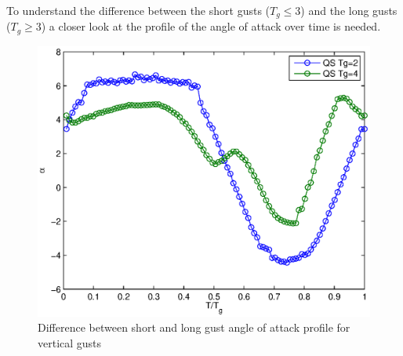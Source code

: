 %
%
%
%


\FloatBarrier

\par To understand the difference between the short gusts ($T_g \leq 3$) and the long gusts ($T_g \geq 3$) a closer look at the profile of the angle of attack over time is needed.


\begin{figure}[h]
  \centering
  \includegraphics{./Figures/alpha_vs_Tg_QS_short_vs_long_wt1.eps}
  \caption{Difference between short and long gust angle of attack profile for vertical gusts}
  \label{fig:short_vs_long_qs_wt=1}
\end{figure}

